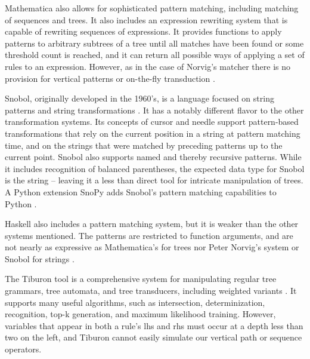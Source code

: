 \documentclass[a4,11pt]{article}
\begin{document}
Mathematica also allows for sophisticated pattern matching, including matching of sequences and trees.  It also includes an expression rewriting system that is capable of rewriting sequences of expressions.  It provides functions to apply patterns to arbitrary subtrees of a tree until all matches have been found or some threshold count is reached, and it can return all possible ways of applying a set of rules to an expression. However, as in the case of Norvig's matcher there is no provision for vertical patterns or on-the-fly transduction \cite{Wolfram:2010}.

Snobol, originally developed in the 1960's, is a language focused on string patterns and string transformations \cite{Griswold:1971}.  It has a notably different flavor to the other transformation systems. Its concepts of cursor and needle support pattern-based transformations that rely on the current position in a string at pattern matching time, and on the strings that were matched by preceding patterns up to the current point.  Snobol also supports named and thereby recursive patterns.  While it includes recognition of balanced parentheses, the expected data type for Snobol is the string -- leaving it a less than direct tool for intricate manipulation of trees.  A Python extension SnoPy adds Snobol's pattern matching capabilities to Python \cite{Rozenberg:2002}.

Haskell also includes a pattern matching system, but it is weaker than the other systems mentioned.  The patterns are restricted to function arguments, and are not nearly as expressive as Mathematica's for trees nor Peter Norvig's system or Snobol for strings \cite{Hudak:2000}.

The Tiburon tool is a comprehensive system for manipulating regular tree grammars, tree automata, and tree transducers, including weighted variants \cite{May-Knight:2008}.  It supports many useful algorithms, such as intersection, determinization, recognition, top-k generation, and maximum likelihood training. 
However, variables that appear in both a rule's lhs and rhs must occur at a depth less than two on the left, and Tiburon cannot easily simulate our vertical path or sequence operators.
\end{document}
